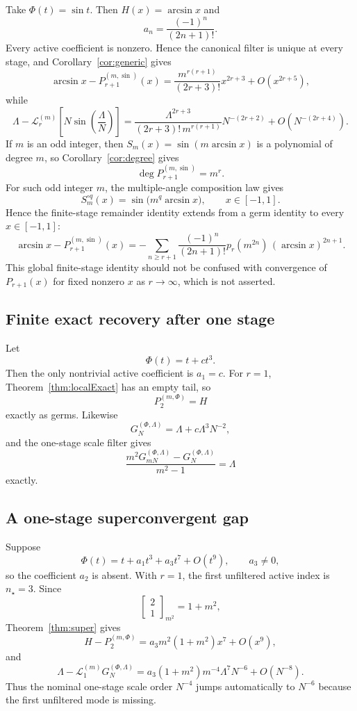 \documentclass[11pt]{article}
\theoremstyle{remark}
\newcommand{\Lop}{\mathcal L}
\begin{document}
Take \(\Phi(t)=\sin t\).  Then \(H(x)=\arcsin x\) and
\[
a_n=\frac{(-1)^n}{(2n+1)!}.
\]
Every active coefficient is nonzero.  Hence the canonical filter is unique
at every stage, and Corollary~\ref{cor:generic} gives
\[
\arcsin x-P_{r+1}^{(m,\sin)}(x)
=
\frac{m^{r(r+1)}}{(2r+3)!}x^{2r+3}+O(x^{2r+5}),
\]
while
\[
\Lambda-\Lop_r^{(m)}
\left[N\sin\!\left(\frac{\Lambda}{N}\right)\right]
=
\frac{\Lambda^{2r+3}}
{(2r+3)!\,m^{r(r+1)}}N^{-(2r+2)}
+O(N^{-(2r+4)}).
\]
If \(m\) is an odd integer, then
\(S_m(x)=\sin(m\arcsin x)\) is a polynomial of degree \(m\), so
Corollary~\ref{cor:degree} gives
\[
\deg P_{r+1}^{(m,\sin)}=m^r.
\]
For such odd integer \(m\), the multiple-angle composition
law gives
\[
S_m^{\circ q}(x)=\sin\!\bigl(m^q\arcsin x\bigr),
\qquad x\in[-1,1].
\]
Hence the finite-stage remainder identity extends from a germ identity to
every \(x\in[-1,1]\):
\[
\boxed{
\arcsin x-P_{r+1}^{(m,\sin)}(x)
=
-\sum_{n\ge r+1}
\frac{(-1)^n}{(2n+1)!}
 p_r(m^{2n})\,(\arcsin x)^{2n+1}.
}
\]
This global finite-stage identity should not be confused with convergence
of \(P_{r+1}(x)\) for fixed nonzero \(x\) as \(r\to\infty\), which is not
asserted.

\subsection{Finite exact recovery after one stage}

Let
\[
\Phi(t)=t+ct^3.
\]
Then the only nontrivial active coefficient is \(a_1=c\).  For \(r=1\),
Theorem~\ref{thm:localExact} has an empty tail, so
\[
P_2^{(m,\Phi)}=H
\]
exactly as germs.  Likewise
\[
G_N^{(\Phi,\Lambda)}
=
\Lambda+c\Lambda^3N^{-2},
\]
and the one-stage scale filter gives
\[
\frac{m^2G_{mN}^{(\Phi,\Lambda)}-G_N^{(\Phi,\Lambda)}}{m^2-1}
=
\Lambda
\]
exactly.

\subsection{A one-stage superconvergent gap}

Suppose
\[
\Phi(t)
=
t+a_1t^3+a_3t^7+O(t^9),
\qquad a_3\neq0,
\]
so the coefficient \(a_2\) is absent.  With \(r=1\), the first unfiltered
active index is \(n_\star=3\).  Since
\[
\begin{bmatrix}2\\1\end{bmatrix}_{m^2}=1+m^2,
\]
Theorem~\ref{thm:super} gives
\[
H-P_2^{(m,\Phi)}
=
a_3m^2(1+m^2)x^7+O(x^9),
\]
and
\[
\Lambda-\Lop_1^{(m)}G_N^{(\Phi,\Lambda)}
=
a_3(1+m^2)m^{-4}\Lambda^7N^{-6}+O(N^{-8}).
\]
Thus the nominal one-stage scale order \(N^{-4}\) jumps automatically to
\(N^{-6}\) because the first unfiltered mode is missing.
\end{document}
